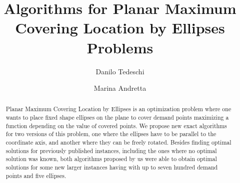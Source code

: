 \documentclass[a4]{elsarticle}
\begin{document}
	
	\begin{frontmatter}
		
		
		\title{Algorithms for Planar Maximum Covering Location by Ellipses Problems}
		
		
		
		
		\author[1]{Danilo Tedeschi}

		
		\author[2]{Marina Andretta}
					
		
		
		\begin{abstract}
			Planar Maximum Covering Location by Ellipses is an optimization problem where one wants to place fixed shape ellipses on the plane to cover demand points
			maximizing a function depending on the value of covered points.
			We propose new exact algorithms for two versions of this problem, one where the ellipses have to be parallel to the coordinate axis, and another where they can be freely rotated. 
			Besides finding optimal solutions for previously published instances, including the ones where no optimal solution was known, both algorithms proposed by us were able to obtain optimal solutions for some new larger instances having with up to seven hundred demand points and five ellipses.
		\end{abstract}
		

\end{frontmatter}
\end{document}
